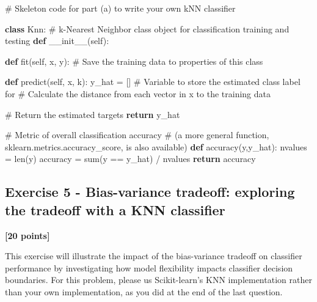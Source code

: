 \documentclass[
  letterpaper,
  DIV=11,
  numbers=noendperiod]{scrartcl}
\newenvironment{Shaded}{\begin{snugshade}}{\end{snugshade}}
\newcommand{\BuiltInTok}[1]{\textcolor[rgb]{0.00,0.23,0.31}{#1}}
\newcommand{\CommentTok}[1]{\textcolor[rgb]{0.37,0.37,0.37}{#1}}
\newcommand{\ControlFlowTok}[1]{\textcolor[rgb]{0.00,0.23,0.31}{\textbf{#1}}}
\newcommand{\FunctionTok}[1]{\textcolor[rgb]{0.28,0.35,0.67}{#1}}
\newcommand{\KeywordTok}[1]{\textcolor[rgb]{0.00,0.23,0.31}{\textbf{#1}}}
\newcommand{\NormalTok}[1]{\textcolor[rgb]{0.00,0.23,0.31}{#1}}
\newcommand{\OperatorTok}[1]{\textcolor[rgb]{0.37,0.37,0.37}{#1}}
\newcommand{\VariableTok}[1]{\textcolor[rgb]{0.07,0.07,0.07}{#1}}
\begin{document}
\begin{Shaded}
\begin{Highlighting}[]
\CommentTok{\# Skeleton code for part (a) to write your own kNN classifier}

\KeywordTok{class}\NormalTok{ Knn:}
\CommentTok{\# k{-}Nearest Neighbor class object for classification training and testing}
    \KeywordTok{def} \FunctionTok{\_\_init\_\_}\NormalTok{(}\VariableTok{self}\NormalTok{):}
        
    \KeywordTok{def}\NormalTok{ fit(}\VariableTok{self}\NormalTok{, x, y):}
        \CommentTok{\# Save the training data to properties of this class}
        
    \KeywordTok{def}\NormalTok{ predict(}\VariableTok{self}\NormalTok{, x, k):}
\NormalTok{        y\_hat }\OperatorTok{=}\NormalTok{ [] }\CommentTok{\# Variable to store the estimated class label for }
        \CommentTok{\# Calculate the distance from each vector in x to the training data}
        
        \CommentTok{\# Return the estimated targets}
        \ControlFlowTok{return}\NormalTok{ y\_hat}

\CommentTok{\# Metric of overall classification accuracy}
\CommentTok{\#  (a more general function, sklearn.metrics.accuracy\_score, is also available)}
\KeywordTok{def}\NormalTok{ accuracy(y,y\_hat):}
\NormalTok{    nvalues }\OperatorTok{=} \BuiltInTok{len}\NormalTok{(y)}
\NormalTok{    accuracy }\OperatorTok{=} \BuiltInTok{sum}\NormalTok{(y }\OperatorTok{==}\NormalTok{ y\_hat) }\OperatorTok{/}\NormalTok{ nvalues}
    \ControlFlowTok{return}\NormalTok{ accuracy}
\end{Highlighting}
\end{Shaded}

\subsection{Exercise 5 - Bias-variance tradeoff: exploring the tradeoff
with a KNN
classifier}\label{exercise-5---bias-variance-tradeoff-exploring-the-tradeoff-with-a-knn-classifier}

\textbf{{[}20 points{]}}

This exercise will illustrate the impact of the bias-variance tradeoff
on classifier performance by investigating how model flexibility impacts
classifier decision boundaries. For this problem, please us
Scikit-learn's KNN implementation rather than your own implementation,
as you did at the end of the last question.
\end{document}
